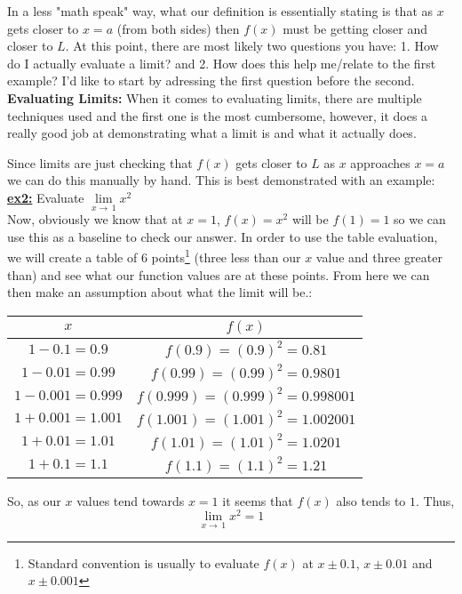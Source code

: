 \documentclass[addpoints]{exam}
\begin{document}
\vspace{0.1in}
\noindent In a less "math speak" way, what our definition is essentially stating is that as $x$ gets closer to $x=a$ (from both sides) then $f(x)$ must be getting closer and closer to $L$. At this point, there are most likely two questions you have: 1. How do I actually evaluate a limit? and 2. How does this help me/relate to the first example? I'd like to start by adressing the first question before the second. \\
\makebox[\linewidth]{\hrulefill}
\newline\large\textbf{Evaluating Limits:}
\newline\normalsize When it comes to evaluating limits, there are multiple techniques used and the first one is the most cumbersome, however, it does a really good job at demonstrating what a limit is and what it actually does.
\begin{tcolorbox}[breakable, title=TABLE EVALUATION, colframe=black, sharp corners, colback=white, colbacktitle=white, coltitle=black]
	Since limits are just checking that $f(x)$ gets closer to $L$ as $x$ approaches $x=a$ we can do this manually by hand. This is best demonstrated with an example: \\
	\underline{\textbf{ex2:}} Evaluate $\lim\limits_{x\to\,1} x^2$ \\
	Now, obviously we know that at $x=1$, $f(x)=x^2$ will be $f(1)=1$ so we can use this as a baseline to check our answer. In order to use the table evaluation, we will create a table of 6 points\footnote{Standard convention is usually to evaluate $f(x)$ at $x \pm 0.1$, $x \pm 0.01$ and $x \pm 0.001$} (three less than our $x$ value and three greater than) and see what our function values are at these points. From here we can then make an assumption about what the limit will be.: \\
	\begin{center}
		\begin{tabular}{|c|c|}
			\hline
			$x$                 & $f(x)$                          \\
			\hline
			$1-0.1 = 0.9$       & $f(0.9)=(0.9)^2 = 0.81$         \\
			\hline
			$1-0.01 = 0.99$     & $f(0.99)=(0.99)^2 = 0.9801$     \\
			\hline
			$1-0.001 = 0.999$   & $f(0.999)=(0.999)^2 = 0.998001$ \\
			\hline
			$1 + 0.001 = 1.001$ & $f(1.001)=(1.001)^2 = 1.002001$ \\
			\hline
			$1 + 0.01 = 1.01$   & $f(1.01)=(1.01)^2 = 1.0201$     \\
			\hline
			$1 + 0.1 = 1.1$     & $f(1.1)=(1.1)^2 = 1.21$         \\
			\hline
		\end{tabular}
	\end{center}
	So, as our $x$ values tend towards $x=1$ it seems that $f(x)$ also tends to $1$. Thus,
	\[\boxed{\lim\limits_{x\to\,1} x^2 = 1}\]
\end{tcolorbox}
\end{document}
